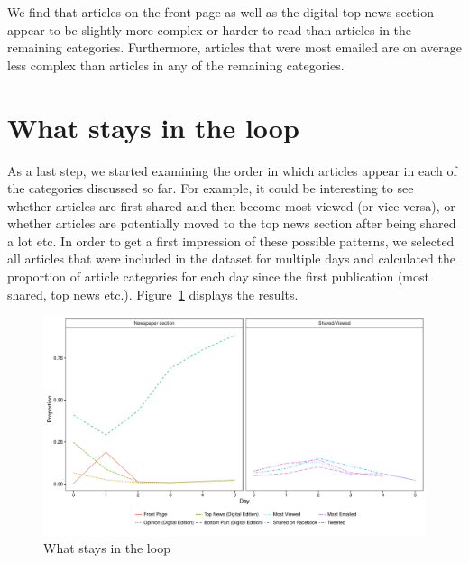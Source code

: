 \documentclass[12pt]{article}
\begin{document}
\begin{doublespace}
We find that articles on the front page as well as the digital top news section appear to be slightly more complex or harder to read than articles in the remaining categories. Furthermore, articles that were most emailed are on average less complex than articles in any of the remaining categories.


\section{What stays in the loop}

As a last step, we started examining the order in which articles appear in each of the categories discussed so far. For example, it could be interesting to see whether articles are first shared and then become most viewed (or vice versa), or whether articles are potentially moved to the top news section after being shared a lot etc. In order to get a first impression of these possible patterns, we selected all articles that were included in the dataset for multiple days and calculated the proportion of article categories for each day since the first publication (most shared, top news etc.). Figure~\ref{fig:switch} displays the results.

\begin{figure}[h]
\caption{What stays in the loop}\label{fig:switch}
\includegraphics[width=\textwidth]{../calc/fig/switch}
\end{figure}


\end{doublespace}
\end{document}
